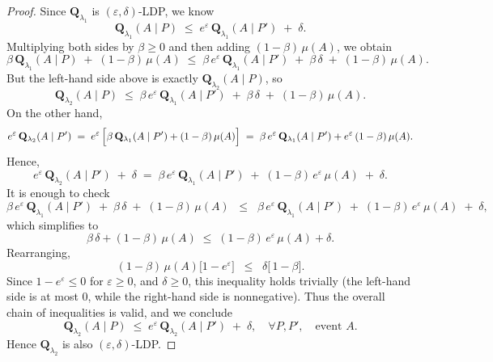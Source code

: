 \documentclass[10pt,a4paper]{amsart}
\newcommand{\bQ}{\mathbf{Q}}
\begin{document}
\begin{proof}
Since $\bQ_{\lambda_1}$ is $(\varepsilon,\delta)$-LDP, we know
\[
  \bQ_{\lambda_1}(A \mid P)
  \;\le\;
  e^\varepsilon\, \bQ_{\lambda_1}(A \mid P') \;+\;\delta.
\]
Multiplying both sides by $\beta \ge 0$ and then adding $(1-\beta)\,\mu(A)$, we obtain
\[
  \beta\,\bQ_{\lambda_1}(A \mid P) \;+\; (1-\beta)\,\mu(A)
  \;\le\;
  \beta\,e^\varepsilon\,\bQ_{\lambda_1}(A \mid P')
  \;+\;
  \beta\,\delta
  \;+\;
  (1-\beta)\,\mu(A).
\]
But the left-hand side above is exactly $\bQ_{\lambda_2}(A \mid P)$, so
\[
  \bQ_{\lambda_2}(A \mid P)
  \;\le\;
  \beta\,e^\varepsilon\,\bQ_{\lambda_1}(A \mid P')
  \;+\;
  \beta\,\delta
  \;+\;
  (1-\beta)\,\mu(A).
\]
On the other hand,
\[
  e^\varepsilon\,\bQ_{\lambda_2}(A \mid P')
  \;=\;
  e^\varepsilon\,\Bigl[\beta\,\bQ_{\lambda_1}(A \mid P') + (1-\beta)\,\mu(A)\Bigr]
  \;=\;
  \beta\,e^\varepsilon\,\bQ_{\lambda_1}(A \mid P') + e^\varepsilon\,(1-\beta)\,\mu(A).
\]
Hence,
\[
  e^\varepsilon\,\bQ_{\lambda_2}(A \mid P') \;+\;\delta
  \;=\;
  \beta\,e^\varepsilon\,\bQ_{\lambda_1}(A \mid P')
  \;+\;
  (1-\beta)\,e^\varepsilon\,\mu(A)
  \;+\;\delta.
\]
It is enough to check
\[
  \beta\,e^\varepsilon\,\bQ_{\lambda_1}(A \mid P')
  \;+\;
  \beta\,\delta
  \;+\;
  (1-\beta)\,\mu(A)
  \;\;\le\;\;
  \beta\,e^\varepsilon\,\bQ_{\lambda_1}(A \mid P')
  \;+\;
  (1-\beta)\,e^\varepsilon\,\mu(A)
  \;+\;
  \delta,
\]
which simplifies to
\[
  \beta\,\delta + (1-\beta)\,\mu(A)
  \;\le\;
  (1-\beta)\,e^\varepsilon\,\mu(A) + \delta.
\]
Rearranging,
\[
  (1-\beta)\,\mu(A)\bigl[1 - e^\varepsilon\bigr]
  \;\;\le\;\;
  \delta \bigl[\,1 - \beta\bigr].
\]
Since $1 - e^\varepsilon \le 0$ for $\varepsilon \ge 0$, and $\delta \ge 0$, this inequality holds trivially (the left-hand side is at most $0$, while the right-hand side is nonnegative). Thus the overall chain of inequalities is valid, and we conclude
\[
  \bQ_{\lambda_2}(A \mid P)
  \;\le\;
  e^\varepsilon\,\bQ_{\lambda_2}(A \mid P') \;+\;\delta,
  \quad
  \forall P,P',\quad \text{event } A.
\]
Hence $\bQ_{\lambda_2}$ is also $(\varepsilon,\delta)$-LDP.
\end{proof}
\end{document}
